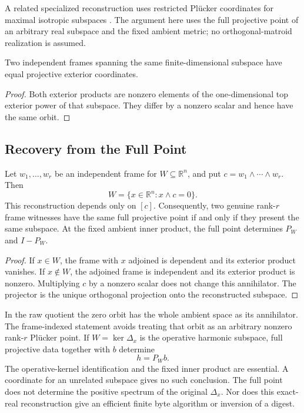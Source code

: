 A related specialized reconstruction uses restricted Pl\"ucker coordinates
for maximal isotropic subspaces \cite{dingKim2026plucker}. The argument here
uses the full projective point of an arbitrary real subspace and the fixed
ambient metric; no orthogonal-matroid realization is assumed.

\begin{proposition}\label{prop:plucker-invariance}
  Two independent frames spanning the same finite-dimensional subspace have
  equal projective exterior coordinates.
\end{proposition}
\begin{proof}
  Both exterior products are nonzero elements of the one-dimensional top
  exterior power of that subspace. They differ by a nonzero scalar and hence
  have the same orbit.
\end{proof}

\subsection{Recovery from the Full Point}

\begin{proposition}
\label{prop:plucker-recovery}
  Let \(w_1,\ldots,w_r\) be an independent frame for
  \(W\subseteq\mathbb R^n\), and put
  \(c=w_1\wedge\cdots\wedge w_r\). Then
  \[
    W=\{x\in\mathbb R^n:x\wedge c=0\}.
  \]
  This reconstruction depends only on \([c]\). Consequently, two genuine
  rank-\(r\) frame witnesses have the same full projective point if and only
  if they present the same subspace. At the fixed ambient inner product,
  the full point determines \(P_W\) and \(I-P_W\).
\end{proposition}
\begin{proof}
  If \(x\in W\), the frame with \(x\) adjoined is dependent and its exterior
  product vanishes. If \(x\notin W\), the adjoined frame is independent and
  its exterior product is nonzero. Multiplying \(c\) by a nonzero scalar
  does not change this annihilator. The projector is the unique orthogonal
  projection onto the reconstructed subspace.
\end{proof}

In the raw quotient the zero orbit has the whole ambient space as its
annihilator. The frame-indexed statement avoids treating that orbit as an
arbitrary nonzero rank-\(r\) Pl\"ucker point.
If \(W=\ker\Delta_x\) is the operative harmonic subspace, full projective
data together with \(b\) determine
\[
  h=P_Wb.
\]
The operative-kernel identification and the fixed inner product are essential.
A coordinate for an unrelated subspace gives no such conclusion. The full
point does not determine the positive spectrum of the original \(\Delta_x\).
Nor does this exact-real reconstruction give an efficient finite byte
algorithm or inversion of a digest.
